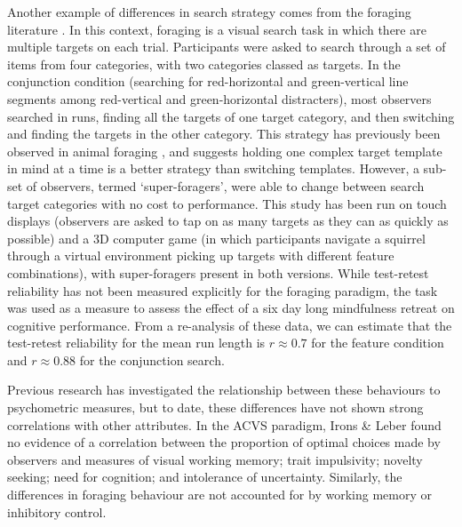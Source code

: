 \documentclass[twocolumn]{article}
\begin{document}
Another example of differences in search strategy comes from the foraging literature \cite{kristjansson2014,johannesson2016}. In this context, foraging is a visual search task in which there are multiple targets on each trial. Participants were asked to search through a set of items from four categories, with two categories classed as targets. In the conjunction condition (searching for red-horizontal and green-vertical line segments among red-vertical and green-horizontal distracters), most observers searched in runs, finding all the targets of one target category, and then switching and finding the targets in the other category. This strategy has previously been observed in animal foraging \cite{dawkins1971}, and suggests holding one complex target template in mind at a time is a better strategy than switching templates. However, a sub-set of observers, termed `super-foragers', were able to change between search target categories with no cost to performance. This study has been run on touch displays\cite{kristjansson2014} (observers are asked to tap on as many targets as they can as quickly as possible) and a 3D computer game (in which participants navigate a squirrel through a virtual environment picking up targets with different feature combinations)\cite{prpic2018}, with super-foragers present in both versions. While test-retest reliability has not been measured explicitly for the foraging paradigm, the task was used as a measure to assess the effect of a six day long mindfulness retreat on cognitive performance\cite{hartkamp2017}. From a re-analysis of these data, we can estimate that the test-retest reliability for the mean run length is $r \approx 0.7$ for the feature condition and $r \approx 0.88$ for the conjunction search.  

Previous research has investigated the relationship between these behaviours to psychometric measures, but to date, these differences have not shown strong correlations with other attributes. In the ACVS paradigm, Irons \& Leber found no evidence of a correlation between the proportion of optimal choices made by observers and measures of visual working memory; trait impulsivity\cite{irons-leber2016}; novelty seeking; need for cognition; and intolerance of uncertainty\cite{irons-leber2018}. Similarly, the differences in foraging behaviour are not accounted for by working memory or inhibitory control\cite{johannesson2017}. 
\end{document}
